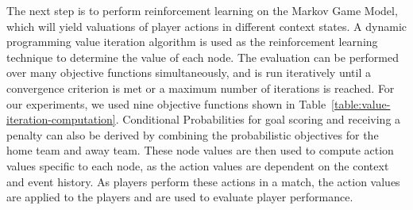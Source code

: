 \documentclass[]{article}
\begin{document}
The next step is to perform reinforcement learning on the Markov Game Model, which will yield valuations of player actions in different context states. A dynamic programming value iteration algorithm is used as the reinforcement learning technique to determine the value of each node. The evaluation can be performed over many objective functions simultaneously, and is run iteratively until a convergence criterion is met or a maximum number of iterations is reached. For our experiments, we used nine objective functions shown in Table~\ref{table:value-iteration-computation}. Conditional Probabilities for goal scoring and receiving a penalty can also be derived by combining the probabilistic objectives for the home team and away team. These node values are then used to compute action values specific to each node, as the action values are dependent on the context and event history. As players perform these actions in a match, the action values are applied to the players and are used to evaluate player performance.

\begin{table}[htb]
\caption{Value Iteration Functions}
\label{table:value-iteration-computation}
\begin{center}
\end{center}
\end{table}


\end{document}
